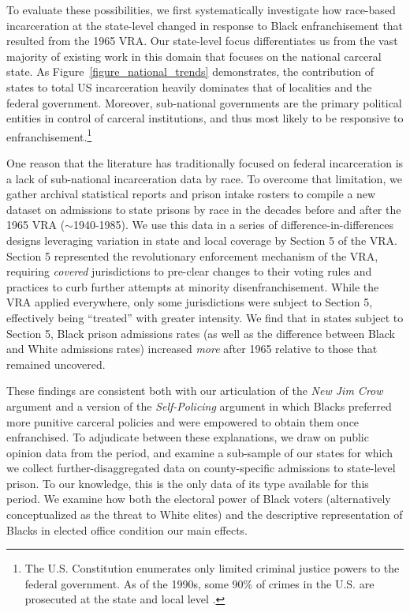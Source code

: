 \documentclass[12pt]{article}
\begin{document}
To evaluate these possibilities, we first systematically investigate how race-based incarceration at the state-level changed in response to Black enfranchisement that resulted from the 1965 VRA.  Our state-level focus differentiates us from the vast majority of existing work in this domain that focuses on the national carceral state.  As Figure~\ref{figure_national_trends} demonstrates, the contribution of states to total US incarceration heavily dominates that of localities and the federal government.  Moreover, sub-national governments are the primary political entities in control of carceral institutions, and thus most likely to be responsive to enfranchisement.\footnote{The U.S. Constitution enumerates only limited criminal justice powers to the federal government.  As of the 1990s, some 90\% of crimes in the U.S. are prosecuted at the state and local level \citep{Sampson:1997wg}.}

One reason that the literature has traditionally focused on federal incarceration is a lack of sub-national incarceration data by race. To overcome that limitation, we gather archival statistical reports and prison intake rosters to compile a new dataset on admissions to state prisons by race in the decades before and after the 1965 VRA ($\sim$1940-1985). We use this data in a series of difference-in-differences designs leveraging variation in state and local coverage by Section 5 of the VRA.  Section 5 represented the revolutionary enforcement mechanism of the VRA, requiring \emph{covered} jurisdictions to pre-clear changes to their voting rules and practices to curb further attempts at minority disenfranchisement.  While the VRA applied everywhere, only some jurisdictions were subject to Section 5, effectively being ``treated'' with greater intensity.  We find that in states subject to Section 5, Black prison admissions rates (as well as the difference between Black and White admissions rates) increased \emph{more} after 1965 relative to those that remained uncovered.

These findings are consistent both with our articulation of the \emph{New Jim Crow} argument and a version of the \emph{Self-Policing} argument in which Blacks preferred more punitive carceral policies and were empowered to obtain them once enfranchised.  To adjudicate between these explanations, we draw on public opinion data from the period, and examine a sub-sample of our states for which we collect further-disaggregated data on county-specific admissions to state-level prison.  To our knowledge, this is the only data of its type available for this period.  We examine how both the electoral power of Black voters (alternatively conceptualized as the threat to White elites) and the descriptive representation of Blacks in elected office condition our main effects.
\end{document}
